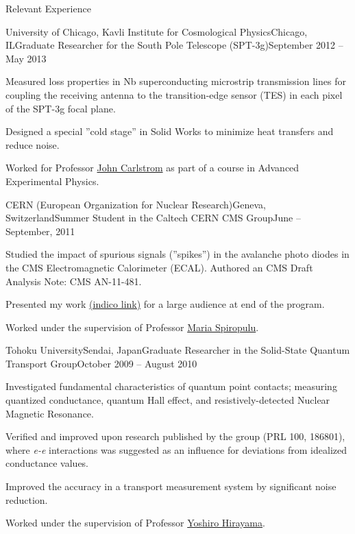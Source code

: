 \documentclass{resume}
\begin{document}
\begin{rsection}{Relevant Experience}
  \begin{rsubsection}{University of Chicago, Kavli Institute for Cosmological Physics}{Chicago, IL}{Graduate Researcher for the South Pole Telescope (SPT-3g)}{September 2012 -- May 2013}
  \item Measured loss properties in Nb superconducting microstrip transmission lines for coupling the receiving antenna to the transition-edge sensor (TES) in each pixel of the SPT-3g focal plane.
  \item Designed a special ''cold stage'' in Solid Works to minimize heat transfers and reduce noise. 
  \item Worked for Professor \href{https://kicp.uchicago.edu/people/profile/john_carlstrom.html}{John Carlstrom} as part of a course in Advanced Experimental Physics.
  \end{rsubsection}


  \begin{rsubsection}{CERN (European Organization for Nuclear Research)}{Geneva, Switzerland}{Summer Student in the Caltech CERN CMS Group}{June -- September, 2011}
  \item Studied the impact of spurious signals (''spikes'') in the avalanche photo diodes in the CMS Electromagnetic Calorimeter (ECAL). Authored an CMS Draft Analysis Note: CMS AN-11-481.
  \item Presented my work \href{http://indico.cern.ch/conferenceDisplay.py?confId=135576}{(indico link)} for a large audience at end of the program.
  \item Worked under the supervision of Professor \href{http://www.hep.caltech.edu/~smaria/}{Maria Spiropulu}.
  \end{rsubsection}


  \begin{rsubsection}{Tohoku University}{Sendai, Japan}{Graduate Researcher in the Solid-State Quantum Transport Group}{October 2009 -- August 2010}
  \item Investigated fundamental characteristics of quantum point contacts; measuring quantized conductance, quantum Hall effect, and resistively-detected Nuclear Magnetic Resonance.
  \item Verified and improved upon research published by the group  (PRL 100, 186801), where \textit{e-e} interactions was suggested as an influence for deviations from idealized conductance values.
  \item Improved the accuracy in a transport measurement system by significant noise reduction.
  \item Worked under the supervision of Professor \href{http://quant-trans.org/lab/profile-e.html}{Yoshiro Hirayama}.
  \end{rsubsection}


\end{rsection}
\end{document}
